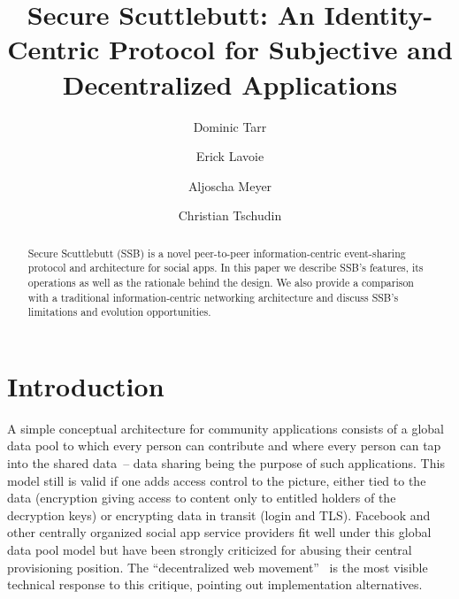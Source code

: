 \documentclass[10pt,sigconf,rewiew]{acmart}
\title{Secure Scuttlebutt: An Identity-Centric Protocol for Subjective and Decentralized Applications }
\author{Dominic Tarr}
\affiliation{ssb:@EMovhfIrFk4NihAKnRNhrf}
\author{Erick Lavoie}
\affiliation{McGill University, Montreal, Canada}
\author{Aljoscha Meyer}
\affiliation{TU Berlin, Germany}
\author{Christian Tschudin}
\affiliation{University of Basel, Switzerland}
\begin{document}

\begin{abstract}
  Secure Scuttlebutt (SSB) is a novel peer-to-peer information-centric
  event-sharing protocol and architecture for social apps. In this
  paper we describe SSB's features, its operations as well as the
  rationale behind the design. We also provide a comparison with
  a traditional information-centric networking architecture and discuss
  SSB's limitations and evolution opportunities.


\end{abstract}

\maketitle


\section{Introduction}

A simple conceptual architecture for community applications consists
of a global data pool to which every person can contribute and where
every person can tap into the shared data~-- data sharing being the
purpose of such applications. This model still is valid if one adds
access control to the picture, either tied to the data (encryption
giving access to content only to entitled holders of the decryption
keys) or encrypting data in transit (login and TLS). Facebook and
other centrally organized social app service providers fit well under
this global data pool model but have been strongly criticized for
abusing their central provisioning position.  The ``decentralized web
movement''~\cite{decent-2018-aug} is the most visible technical
response to this critique, pointing out implementation alternatives.
\end{document}
